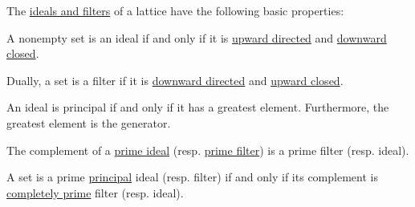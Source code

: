\begin{proposition}\label{thm:def:lattice_ideal}
  The \hyperref[def:lattice_ideal]{ideals and filters} of a lattice have the following basic properties:
  \begin{thmenum}
     A nonempty set is an ideal if and only if it is \hyperref[def:directed_set]{upward directed} and \hyperref[def:closed_ordered_subset]{downward closed}.

    Dually, a set is a filter if it is \hyperref[def:directed_set]{downward directed} and \hyperref[def:closed_ordered_subset]{upward closed}.

     An ideal is principal if and only if it has a greatest element. Furthermore, the greatest element is the generator.

     The complement of a \hyperref[def:lattice_ideal/prime]{prime ideal} (resp. \hyperref[def:lattice_ideal/prime]{prime filter}) is a prime filter (resp. ideal).

     A set is a prime \hyperref[def:lattice_ideal/principal]{principal} ideal (resp. filter) if and only if its complement is \hyperref[def:lattice_ideal/completely_prime]{completely prime} filter (resp. ideal).
  \end{thmenum}
\end{proposition}

